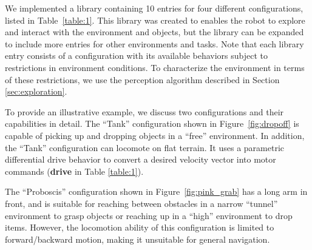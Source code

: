 \documentclass[journal]{IEEEtran}
\begin{document}
We implemented a library containing 10 entries for four different configurations,
listed in Table~\ref{table:1}.
This library was created to enables the robot to explore and interact with the environment and objects, but the library can be expanded to include more entries for other environments and tasks. 
Note that each library entry consists of a configuration with its available behaviors subject to restrictions in environment conditions. To characterize the environment in terms of these restrictions, we use the perception algorithm described in Section \ref{sec:exploration}.

To provide an illustrative example, we discuss two configurations and their capabilities in detail.
The ``Tank'' configuration shown in Figure~\ref{fig:dropoff} is capable of picking
up and dropping objects in a ``free'' environment. In addition, the ``Tank'' configuration can locomote on flat terrain. It uses a parametric differential drive behavior to convert a desired velocity vector into motor commands (\textbf{drive} in Table \ref{table:1}).

The ``Proboscis'' configuration shown in Figure~\ref{fig:pink_grab} has
a long arm in front, and is suitable for reaching between obstacles in a narrow ``tunnel'' environment to grasp objects or reaching up in a ``high'' environment to drop items.
However, the locomotion ability of this configuration is limited to forward/backward
motion, making it unsuitable for general navigation.
\end{document}
